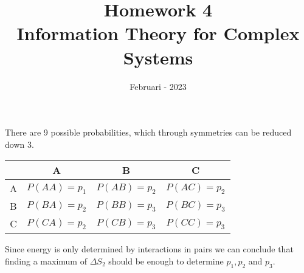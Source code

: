 \documentclass[a4paper, 12pt]{article}
\begin{document}
\title{\vspace{-6em}\textbf{Homework 4}\\ \Large Information Theory for Complex Systems \vspace{-3.2em} }
\author{}
\date{Februari - 2023}

\maketitle


There are 9 possible probabilities, which through symmetries can be reduced down 3.
\begin{center}
    \begin{tabular}{c|c|c|c}
         & A & B & C \\ \hline
        A & $P(AA) = p_1$ & $P(AB) = p_2$ & $P(AC) = p_2$ \\ \hline
        B & $P(BA) = p_2$ & $P(BB) = p_3$ & $P(BC) = p_3$ \\ \hline
        C & $P(CA) = p_2$ & $P(CB) = p_3$ & $P(CC) = p_3$ \\
    \end{tabular}
\end{center}
Since energy is only determined by interactions in pairs we can conclude that finding a maximum of $\Delta S_2$ should be enough to determine $p_1,p_2$ and $p_3$.
\end{document}
